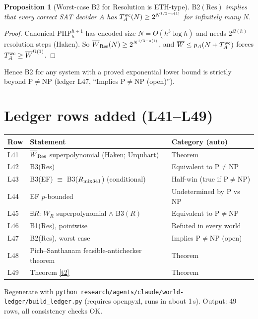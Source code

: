 \documentclass[11pt]{article}
\newtheorem{proposition}[theorem]{Proposition}
\newcommand{\Wb}{\overline W}
\begin{document}
\begin{proposition}[Worst-case B2 for Resolution is ETH-type]\label{p4}
$\mathrm{B2}(\mathrm{Res})$ implies that every correct SAT decider $A$ has
$T^{\rm wc}_A(N)\ge 2^{N^{1/3-o(1)}}$ for infinitely many $N$.
\end{proposition}
\begin{proof}
Canonical $\mathrm{PHP}^{h+1}_h$ has encoded size $N=\Theta(h^3\log h)$ and needs $2^{\Omega(h)}$
resolution steps (Haken). So $\Wb_{\rm Res}(N)\ge 2^{N^{1/3-o(1)}}$, and
$\Wb\le p_A(N+T^{\rm wc}_A)$ forces $T^{\rm wc}_A\ge \Wb^{\Omega(1)}$.
\end{proof}
Hence B2 for any system with a proved exponential lower bound is strictly beyond
$\mathrm P\ne\mathrm{NP}$ (ledger L47, ``Implies $\mathrm P\ne\mathrm{NP}$ (open)'').

\section{Ledger rows added (L41--L49)}
\begin{center}\small
\begin{tabular}{lll}
Row & Statement & Category (auto)\\\hline
L41 & $\Wb_{\rm Res}$ superpolynomial (Haken; Urquhart) & Theorem\\
L42 & B3(Res) & Equivalent to $\mathrm P\ne\mathrm{NP}$\\
L43 & B3(EF) $\equiv$ B3($R_{\rm mix341}$) (conditional) & Half-win (true if $\mathrm P\ne\mathrm{NP}$)\\
L44 & EF $p$-bounded & Undetermined by P vs NP\\
L45 & $\exists R$: $\Wb_R$ superpolynomial $\wedge$ B3$(R)$ & Equivalent to $\mathrm P\ne\mathrm{NP}$\\
L46 & B1(Res), pointwise & Refuted in every world\\
L47 & B2(Res), worst case & Implies $\mathrm P\ne\mathrm{NP}$ (open)\\
L48 & Pich--Santhanam feasible-antichecker theorem & Theorem\\
L49 & Theorem \ref{t2} & Theorem\\
\end{tabular}
\end{center}
Regenerate with \texttt{python research/agents/claude/world-ledger/build\_ledger.py}
(requires openpyxl, runs in about 1\,s). Output: 49 rows, all consistency checks OK.
\end{document}
